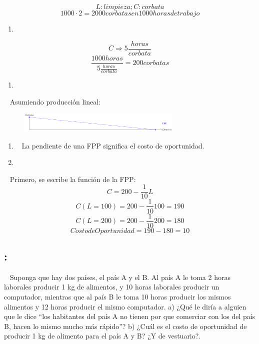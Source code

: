 \documentclass[
  letterpaper,
  DIV=11,
  numbers=noendperiod]{scrreport}
\providecommand{\tightlist}{%
  \setlength{\itemsep}{0pt}\setlength{\parskip}{0pt}}\usepackage{longtable,booktabs,array}
\begin{document}
\[L: limpieza ; C: corbata\]
\[1000 \cdot 2 = 2000 corbatas en 1000 horas de trabajo\]

\begin{enumerate}
\def\labelenumi{\alph{enumi})}
\setcounter{enumi}{1}
\tightlist
\item
\end{enumerate}

\[C \Rightarrow 5 \frac{horas}{corbata}\]
\[\frac{1000 horas}{5\frac{horas}{corbata}}=200 corbatas\]

\begin{enumerate}
\def\labelenumi{\alph{enumi})}
\setcounter{enumi}{2}
\tightlist
\item
\end{enumerate}

~ Asumiendo producción lineal:

\begin{figure}

{\centering \includegraphics[width=0.7\textwidth,height=\textheight]{7,8titulo_files/figure-pdf/unnamed-chunk-8-1.pdf}

}

\end{figure}

\begin{enumerate}
\def\labelenumi{\alph{enumi})}
\setcounter{enumi}{3}
\item
  ~ La pendiente de una FPP significa el costo de oportunidad.
\item
\end{enumerate}

~ Primero, se escribe la función de la FPP: \[C=200-\frac{1}{10}L\]
\[C(L=100)=200-\frac{1}{10}100=190\]
\[C(L=200)=200-\frac{1}{10}200=180\] \[Costo de Oportunidad=190-180=10\]

\hypertarget{section-3}{%
\subsection{:}\label{section-3}}

~ Suponga que hay dos países, el país A y el B. Al país A le toma 2
horas laborales producir 1 kg de alimentos, y 10 horas laborales
producir un computador, mientras que al país B le toma 10 horas producir
los mismos alimentos y 12 horas producir el mismo computador. a) ¿Qué le
diría a alguien que le dice ``los habitantes del país A no tienen por
que comerciar con los del país B, hacen lo mismo mucho más rápido''? b)
¿Cuál es el costo de oportunidad de producir 1 kg de alimento para el
país A y B? ¿Y de vestuario?.
\end{document}
